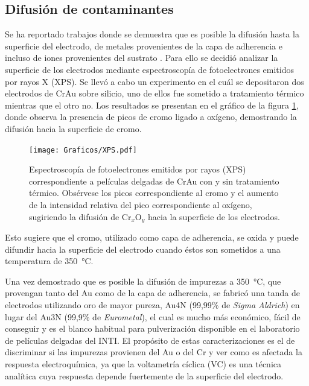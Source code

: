 	\subsection{Difusión de contaminantes}

			Se ha reportado trabajos donde se demuestra que es posible la difusión hasta la superficie del electrodo, de metales provenientes de la capa de adherencia e incluso de iones provenientes del sustrato \cite{Alonso1990,Moody2003}. Para ello se decidió analizar la superficie de los electrodos mediante espectroscopía de fotoelectrones emitidos por rayos X (XPS). Se llevó a cabo un experimento en el cuál se depositaron dos electrodos de Cr\textbar Au sobre silicio, uno de ellos fue sometido a tratamiento térmico mientras que el otro no. Los resultados se presentan en el gráfico de la figura \ref{fig:XPS}, donde observa la presencia de picos de cromo ligado a oxígeno, demostrando la difusión hacia la superficie de cromo.
				
				\begin{figure}[hb!]
		 	       	\begin{center}
		 	       	\texttt{[image: Graficos/XPS.pdf]}
		        	\caption[XPS de películas delgadas de Cr\textbar Au]{Espectroscopía de fotoelectrones emitidos por rayos (XPS) correspondiente a películas delgadas de Cr\textbar Au con y sin tratamiento térmico. Obsérvese los picos correspondiente al cromo y el aumento de la intensidad relativa del pico correspondiente al oxígeno, sugiriendo la difusión de Cr$_x$O$_y$ hacia la superficie de los electrodos.}
		         	\label{fig:XPS}
		         	\end{center}
		     		\end{figure}

			Esto sugiere que el cromo, utilizado como capa de adherencia, se oxida y puede difundir hacia la superficie del electrodo cuando éstos son sometidos a una temperatura de \SI{350}{\celsius}.

			Una vez demostrado que es posible la difusión de impurezas a \SI{350}{\celsius}, que provengan tanto del Au como de la capa de adherencia, se fabricó una tanda de electrodos utilizando oro de mayor pureza, Au4N (99,99\% de \textit{Sigma Aldrich}) en lugar del Au3N (99,9\% de \textit{Eurometal}), el cual es mucho más económico, fácil de conseguir y es el blanco habitual para pulverización disponible en el laboratorio de películas delgadas del INTI. El propósito de estas caracterizaciones es el de discriminar si las impurezas provienen del Au o del Cr y ver como es afectada la respuesta electroquímica, ya que la voltametría cíclica (VC) es una técnica analítica cuya respuesta depende fuertemente de la superficie del electrodo.\cite{Wi2000,Pumera2007,Gewirth2004,Villullas2000}

